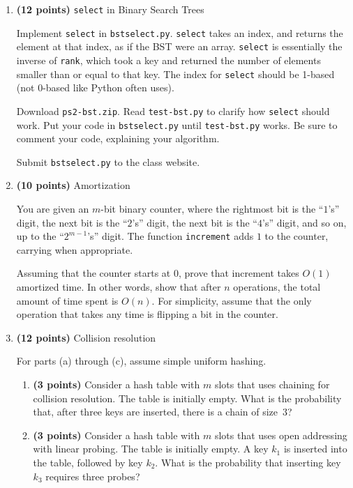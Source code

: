 \documentclass[12pt,twoside]{article}
\begin{document}
\hrulefill

\begin{enumerate}

\item {\bf (12 points)} \texttt{select} in Binary Search Trees
  
  Implement \texttt{select} in \texttt{bstselect.py}. \texttt{select}
  takes an index, and returns the element at that index, as if the BST
  were an array. \texttt{select} is essentially the inverse of
  \texttt{rank}, which took a key and returned the number of elements
  smaller than or equal to that key. The index for \texttt{select} should be
  1-based (not 0-based like Python often uses).
  
  Download \texttt{ps2-bst.zip}. Read \texttt{test-bst.py} to
  clarify how \texttt{select} should work. Put your code in
  \texttt{bstselect.py} until \texttt{test-bst.py} works. Be sure to
  comment your code, explaining your algorithm.

  Submit \texttt{bstselect.py} to the class website.

\item {\bf (10 points)} Amortization

  You are given an $m$-bit binary counter, where the rightmost bit is
  the ``$1$'s'' digit, the next bit is the ``$2$'s'' digit, the next bit
  is the ``$4$'s'' digit, and so on, up to the ``$2^{m-1}$'s''
  digit. The function \texttt{increment} adds $1$ to the counter,
  carrying when appropriate.
  
  Assuming that the counter starts at $0$, prove that increment takes
  $O(1)$ amortized time.  In other words, show that after $n$ operations,
  the total amount of time spent is $O(n)$.  For simplicity, assume
  that the only operation that takes any time is flipping a bit in
  the counter.
  
\item {\bf (12 points)} Collision resolution

  For parts (a) through (c), assume simple uniform hashing.

  \begin{enumerate}

  \item {\bf (3 points)} Consider a hash table with $m$ slots that uses
    chaining for collision resolution.  The table is initially empty.
    What is the probability that, after three keys are inserted,
    there is a chain of size~$3$?
      
  \item {\bf (3 points)} Consider a hash table with $m$ slots that
    uses open addressing with linear probing.  The table is initially
    empty. A key $k_1$ is inserted into the table, followed by key
    $k_2$.  What is the probability that inserting key $k_3$
    requires three probes?
      

\end{enumerate}
\end{enumerate}
\end{document}
